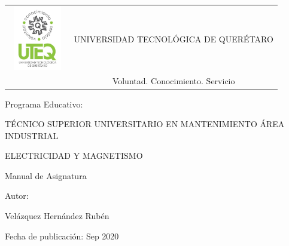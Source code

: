 \pagestyle{empty}

\bgroup\sffamily

\noindent
\begin{tabular}{|c|c|} 
\hline

\includegraphics[width=2.5cm,height=2.8cm]{Imagenes/LogoUTEQ}&	
\Large { UNIVERSIDAD TECNOLÓGICA DE QUERÉTARO} \\
	        &Voluntad. Conocimiento. Servicio\\
\hline	
\end{tabular}
\vspace{1.5cm}
\begin{center}
\large {Programa Educativo:}

\vspace{1cm}
TÉCNICO SUPERIOR UNIVERSITARIO EN MANTENIMIENTO ÁREA INDUSTRIAL

\vspace{2cm}
\Large{ELECTRICIDAD Y MAGNETISMO}

Manual de Asignatura
\end{center}
\vspace{2cm}

\begin{large}
Autor:

Velázquez Hernández Rubén

Fecha de publicación: Sep 2020
\end{large}